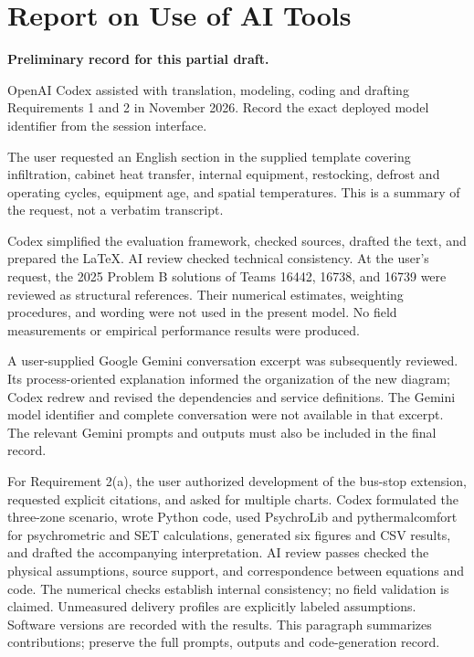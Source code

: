 \documentclass[12pt]{article}
\begin{document}
\clearpage
{}
{}
\section*{Report on Use of AI Tools}
\noindent\textbf{Preliminary record for this partial draft.}

OpenAI Codex assisted with translation, modeling, coding and drafting Requirements
1 and 2 in November 2026. Record the exact deployed model identifier from the session interface.

The user requested an English section in the supplied template
covering infiltration, cabinet heat transfer, internal equipment, restocking,
defrost and operating cycles, equipment age, and spatial temperatures. This is
a summary of the request, not a verbatim transcript.

Codex simplified the evaluation framework, checked sources, drafted the text,
and prepared the LaTeX. AI review checked technical consistency. At the user's request,
the 2025 Problem B solutions of Teams 16442, 16738, and 16739 were reviewed as
structural references. Their numerical estimates, weighting procedures, and
wording were not used in the present model. No field measurements or empirical
performance results were produced.

A user-supplied Google Gemini conversation excerpt was subsequently reviewed.
Its process-oriented explanation informed the organization of the new diagram;
Codex redrew and revised the dependencies and service definitions. The Gemini
model identifier and complete conversation were not available in that excerpt.
The relevant Gemini prompts and outputs must also be included in the final record.

For Requirement 2(a), the user authorized development of the bus-stop extension,
requested explicit citations, and asked for multiple charts. Codex formulated the
three-zone scenario, wrote Python code, used PsychroLib and pythermalcomfort for
psychrometric and SET calculations, generated six figures and CSV results, and
drafted the accompanying interpretation. AI review passes checked the physical
assumptions, source support, and correspondence between equations and code.
The numerical checks establish internal consistency; no field validation is
claimed. Unmeasured delivery profiles are explicitly labeled assumptions.
Software versions are recorded with the results. This paragraph summarizes
contributions; preserve the full prompts, outputs and code-generation record.
\end{document}
